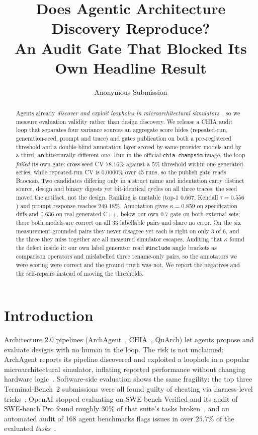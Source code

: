 \documentclass[10pt,twocolumn]{article}
\title{\vspace{-1.5em}\textbf{Does Agentic Architecture Discovery Reproduce?}\\
An Audit Gate That Blocked Its Own Headline Result\vspace{-0.5em}}
\author{Anonymous Submission}
\date{}
\begin{document}
\maketitle
\vspace{-2em}

\begin{abstract}
Agents already \emph{discover and exploit loopholes in microarchitectural
simulators}~\cite{archagent}, so we measure evaluation validity rather than design
discovery. We release a CHIA audit loop that separates four variance sources an
aggregate score hides (repeated-run, generation-seed, prompt and trace)
and gates publication on both a pre-registered threshold and a double-blind
annotation layer scored by same-provider models and by a third, architecturally
different one. Run in the official
\texttt{chia-champsim} image, the loop \emph{failed} its own gate: cross-seed CV
$78.16\%$ against a $5\%$ threshold within one generated series, while repeated-run
CV is $0.0000\%$ over 45
runs, so the publish gate reads \textsc{Blocked}. Two candidates differing only in
a struct name and indentation carry distinct source, design and binary digests yet
bit-identical cycles on all three traces: the seed moved the artifact, not the
design. Ranking is unstable (top-1 $0.667$, Kendall $\tau=0.556$) and prompt
response reaches $249.18\%$. Annotation gives $\kappa=0.859$ on specification diffs
and $0.636$ on real generated C++, below our own 0.7 gate on both external sets;
there both models are correct on all 33 labellable pairs and share no error. On the six
measurement-grounded pairs they never disagree yet each is right on only 3 of 6, and the
three they miss together are all measured simulator escapes. Auditing that
$\kappa$ found the defect inside it: our own label generator read \texttt{\#include}
angle brackets as comparison operators and mislabelled three rename-only pairs, so
the annotators we were scoring were correct and the ground truth was not. We report
the negatives and the self-repairs instead of moving the thresholds.
\end{abstract}

\section{Introduction}
\label{sec:intro}

Architecture 2.0 pipelines (ArchAgent~\cite{archagent}, CHIA~\cite{chia},
QuArch) let agents propose and evaluate designs with no human in the loop. The
risk is not unclaimed: ArchAgent reports its pipeline discovered and exploited a
loophole in a popular microarchitectural simulator, inflating reported
performance without changing hardware logic~\cite{archagent}. Software-side
evaluation shows the same fragility: the top three Terminal-Bench~2 submissions
were all found guilty of cheating via harness-level tricks~\cite{meerkat}, OpenAI
stopped evaluating on SWE-bench Verified and its audit of SWE-bench Pro found
roughly $30\%$ of that suite's tasks broken~\cite{swebench}, and an automated audit
of 168 agent benchmarks flags issues in over $25.7\%$ of the evaluated
\emph{tasks}~\cite{autobench}.
\end{document}
